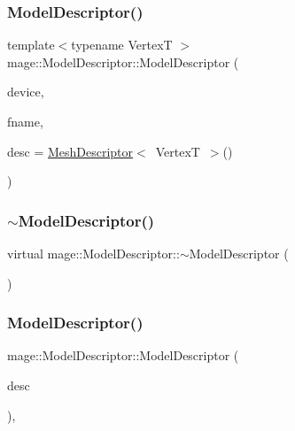 \subsubsection{\texorpdfstring{Model\+Descriptor()}{ModelDescriptor()}\hspace{0.1cm}{\footnotesize\ttfamily [1/2]}}
{\footnotesize\ttfamily template$<$typename VertexT $>$ \\
mage\+::\+Model\+Descriptor\+::\+Model\+Descriptor (\begin{DoxyParamCaption}\item[{const \hyperlink{classmage_1_1_rendering_device}{Rendering\+Device} \&}]{device,  }\item[{const wstring \&}]{fname,  }\item[{const \hyperlink{structmage_1_1_mesh_descriptor}{Mesh\+Descriptor}$<$ VertexT $>$ \&}]{desc = {\ttfamily \hyperlink{structmage_1_1_mesh_descriptor}{Mesh\+Descriptor}$<$~VertexT~$>$()} }\end{DoxyParamCaption})}

\hypertarget{classmage_1_1_model_descriptor_a3bc8ee3d1cb8d2675374727edce3d593}{}\label{classmage_1_1_model_descriptor_a3bc8ee3d1cb8d2675374727edce3d593} 
\subsubsection{\texorpdfstring{$\sim$\+Model\+Descriptor()}{~ModelDescriptor()}}
{\footnotesize\ttfamily virtual mage\+::\+Model\+Descriptor\+::$\sim$\+Model\+Descriptor (\begin{DoxyParamCaption}{ }\end{DoxyParamCaption})\hspace{0.3cm}{\ttfamily [virtual]}}

\hypertarget{classmage_1_1_model_descriptor_af44185efc20e10ede762d29bc454c5f3}{}\label{classmage_1_1_model_descriptor_af44185efc20e10ede762d29bc454c5f3} 
\subsubsection{\texorpdfstring{Model\+Descriptor()}{ModelDescriptor()}\hspace{0.1cm}{\footnotesize\ttfamily [2/2]}}
{\footnotesize\ttfamily mage\+::\+Model\+Descriptor\+::\+Model\+Descriptor (\begin{DoxyParamCaption}\item[{const \hyperlink{classmage_1_1_model_descriptor}{Model\+Descriptor} \&}]{desc }\end{DoxyParamCaption})\hspace{0.3cm}{\ttfamily [private]}, {\ttfamily [delete]}}



